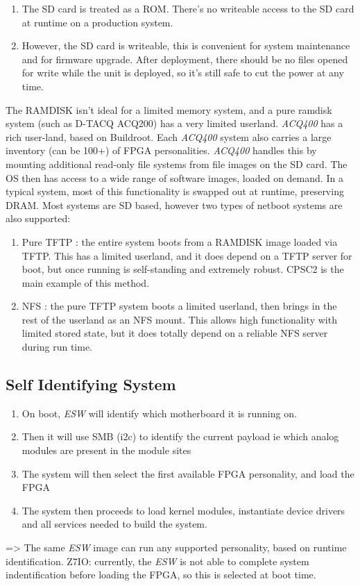 \documentclass[]{article}
\newcommand{\glossy}[1]{{\color{blue}\itshape #1}}
\begin{document}
\begin{enumerate}
    \item The SD card is treated as a ROM. There’s no writeable access to the SD card at runtime on a production system.
    \item However, the SD card is writeable, this is convenient for system maintenance and for firmware upgrade.  After deployment, there should be no files opened for write while the unit is deployed, so it’s still safe to cut the power at any time.
\end{enumerate} 
The RAMDISK isn’t ideal for a limited memory system, and a pure ramdisk system (such as D-TACQ ACQ200) has a very limited userland. \glossy{ACQ400} has a rich user-land, based on Buildroot. Each \glossy{ACQ400} system also carries a large inventory (can be 100+) of FPGA personalities. \glossy{ACQ400} handles this by mounting additional read-only file systems from file images on the SD card. The OS then has access to a wide range of software images, loaded on demand. In a typical system, most of this functionality is swapped out at runtime, preserving DRAM.
Most systems are SD based, however two types of netboot systems are also supported:
\begin{enumerate}
    \item Pure TFTP : the entire system boots from a RAMDISK image loaded via TFTP. This has a limited userland, and it does depend on a TFTP server for boot, but once running is self-standing and extremely robust. CPSC2 is the main example of this method.
    \item NFS : the pure TFTP system boots a limited userland, then brings in the rest of the userland as an NFS mount. This allows high functionality with limited stored state, but it does totally depend on a reliable NFS server during run time.
\end{enumerate} 

\subsection{Self Identifying System}
\begin{enumerate}
    \item On boot, \glossy{ESW} will identify which motherboard it is running on.
    \item Then it will use SMB (i2c) to identify the current payload 
        	ie which analog modules are present in the module sites
    \item The system will then select the first available FPGA personality, and load the FPGA
    \item The system then proceeds to load kernel modules, instantiate device drivers and all services needed to build the system.
\end{enumerate}
=> The same \glossy{ESW} image can run any supported personality, based on runtime identification.
Z7IO: currently, the \glossy{ESW} is not able to complete system indentification before loading the FPGA, so this is selected at boot time.
\end{document}
